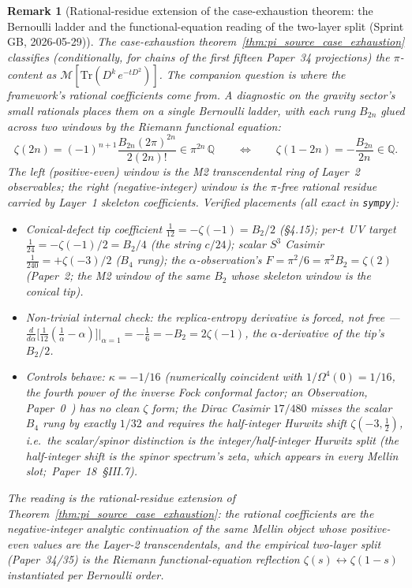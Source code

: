 \documentclass[11pt]{article}
\newtheorem{remark}{Remark}
\begin{document}
\begin{remark}[Rational-residue extension of the case-exhaustion theorem:
the Bernoulli ladder and the functional-equation reading of the two-layer
split (Sprint GB, 2026-05-29)]
\label{rem:bernoulli_ladder}
The case-exhaustion theorem~\ref{thm:pi_source_case_exhaustion} classifies
(conditionally, for chains of the first fifteen Paper~34 projections)
the $\pi$-content as
$\mathcal{M}[\mathrm{Tr}(D^k\, e^{-tD^2})]$. The companion question is
where the framework's \emph{rational} coefficients come from. A
diagnostic on the gravity sector's small rationals places them on a single
Bernoulli ladder, with each rung $B_{2n}$ glued across two windows by the
Riemann functional equation:
$$
\zeta(2n) = (-1)^{n+1}\frac{B_{2n}(2\pi)^{2n}}{2(2n)!}
   \in \pi^{2n}\,\mathbb{Q}
\qquad\Longleftrightarrow\qquad
\zeta(1-2n) = -\frac{B_{2n}}{2n} \in \mathbb{Q}.
$$
The left (positive-even) window is the M2 transcendental ring of
Layer~2 observables; the right (negative-integer) window is the
$\pi$-free rational residue carried by Layer~1 skeleton coefficients.
Verified placements (all exact in \texttt{sympy}):
\begin{itemize}
\item Conical-defect tip coefficient $\tfrac{1}{12} = -\zeta(-1) =
B_2/2$ (\S4.15); per-$t$ UV target $\tfrac{1}{24} = -\zeta(-1)/2 =
B_2/4$ (the string $c/24$); scalar $S^3$ Casimir $\tfrac{1}{240} =
+\zeta(-3)/2$ ($B_4$ rung); the $\alpha$-observation's
$F = \pi^2/6 = \pi^2 B_2 = \zeta(2)$ (Paper~2; the M2 window of the
same $B_2$ whose skeleton window is the conical tip).
\item \emph{Non-trivial internal check}: the replica-entropy
derivative is forced, not free ---
$\frac{d}{d\alpha}\big[\tfrac{1}{12}(\tfrac{1}{\alpha}-\alpha)\big]
\big|_{\alpha=1} = -\tfrac{1}{6} = -B_2 = 2\zeta(-1)$, the
$\alpha$-derivative of the tip's $B_2/2$.
\item \emph{Controls behave}: $\kappa = -1/16$ (numerically
coincident with $1/\Omega^4(0) = 1/16$, the fourth power of the inverse Fock conformal factor; an Observation,
Paper~0~\cite{paper0}) has no clean $\zeta$ form; the Dirac Casimir
$17/480$ misses the scalar $B_4$ rung by exactly $1/32$ and requires
the half-integer Hurwitz shift $\zeta(-3,\tfrac{1}{2})$, i.e.\ the
scalar/spinor distinction is the integer/half-integer Hurwitz split
(the half-integer shift is the spinor spectrum's zeta, which appears in
every Mellin slot;\ Paper~18~\S III.7).
\end{itemize}
The reading is the rational-residue extension of
Theorem~\ref{thm:pi_source_case_exhaustion}: the rational coefficients
are the negative-integer analytic continuation of the \emph{same}
Mellin object whose positive-even values are the Layer-2
transcendentals, and the empirical two-layer split (Paper~34/35) is the
Riemann functional-equation reflection $\zeta(s)\leftrightarrow
\zeta(1-s)$ instantiated per Bernoulli order.


\end{remark}
\end{document}
